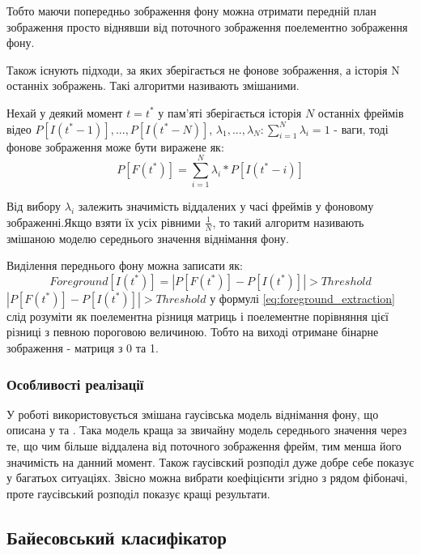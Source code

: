 Тобто маючи попередньо зображення фону можна отримати передній план зображення просто віднявши від поточного зображення поелементно зображення фону.

Також існують підходи, за яких зберігається не фонове зображення, а історія N останніх зображень. Такі алгоритми називають змішаними.

Нехай у деякий момент $t = t^{*}$ у пам'яті зберігається історія $N$ останніх фреймів відео $P[I(t^{*} - 1)], ... , P[I(t^{*} - N)]$, $\lambda_{1}, ... , \lambda_{N} : \sum_{i = 1}^{N} \lambda_{i} = 1$ - ваги, тоді фонове зображення може бути виражене як:
\begin{equation}
	P[F(t^{*})] = \sum_{ i = 1}^{N} \lambda_{i} * P[I(t^{*} - i)]
	\label{eq:background_approximation}
\end{equation}

Від вибору $\lambda_{i}$ залежить значимість віддалених у часі фреймів у фоновому зображенні.Якщо взяти їх усіх рівними $\frac{1}{N}$, то такий алгоритм називають змішаною моделю середнього значення віднімання фону. 

Виділення переднього фону можна записати як:
\begin{equation}
Foreground[I(t^{*})] = | P[F(t^{*})] - P[I(t^{*})] | > Threshold
\label{eq:foreground_extraction}
\end{equation}
$| P[F(t^{*})] - P[I(t^{*})] | > Threshold$ у формулі \ref{eq:foreground_extraction} слід розуміти як поелементна різниця матриць і поелементне порівняння цієї різниці з певною пороговою величиною. Тобто на виході отримане бінарне зображення - матриця з 0 та 1.

\subsubsection{Особливості реалізації}

У роботі використовується змішана гаусівська модель віднімання фону, що описана у \cite{MOG1} та \cite{MOG2}. Така модель краща за звичайну модель середнього значення через те, що чим більше віддалена від поточного зображення фрейм, тим менша його значимість на данний момент. Також гаусівский розподіл дуже добре себе показує у багатьох ситуаціях. Звісно можна вибрати коефіцієнти згідно з рядом фібоначі, проте гаусівський розподіл показує кращі результати.

\subsection{Байесовський класифікатор}

